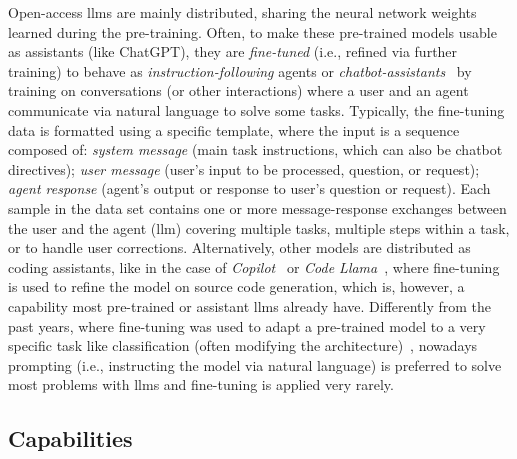 \documentclass[manuscript,screen]{acmart}
\begin{document}
Open-access \acp{llm} are mainly distributed, sharing the neural network weights learned during the pre-training.
Often, to make these pre-trained models usable as assistants (like ChatGPT), they are \emph{fine-tuned} (i.e., refined via further training) to behave as \emph{instruction-following} agents or \emph{chatbot-assistants}~\cite{DBLP:conf/iclr/SanhWRBSACSRDBX22,DBLP:journals/corr/abs-2210-11416,DBLP:journals/csur/ScottiST24} by training on conversations (or other interactions) where a user and an agent communicate via natural language to solve some tasks.
Typically, the fine-tuning data is formatted using a specific template, where the input is a sequence composed of:
\emph{system message} (main task instructions, which can also be chatbot directives);
\emph{user message} (user's input to be processed, question, or request);
\emph{agent response} (agent's output or response to user's question or request).
Each sample in the data set contains one or more message-response exchanges between the user and the agent (\ac{llm}) covering multiple tasks, multiple steps within a task, or to handle user corrections.
Alternatively, other models are distributed as coding assistants, like in the case of \emph{Copilot}~\cite{github2023copilot} or \emph{Code Llama}~\cite{DBLP:journals/corr/abs-2308-12950}, where fine-tuning is used to refine the model on source code generation, which is, however, a capability most pre-trained or assistant \acp{llm} already have.
Differently from the past years, where fine-tuning was used to adapt a pre-trained model to a very specific task like classification (often modifying the architecture)~\cite{radford2018improving,DBLP:conf/naacl/DevlinCLT19}, nowadays prompting (i.e., instructing the model via natural language) is preferred to solve most problems with \acp{llm} and fine-tuning is applied very rarely. %

\subsection{Capabilities}
\label{sec:capabilities}
\end{document}
